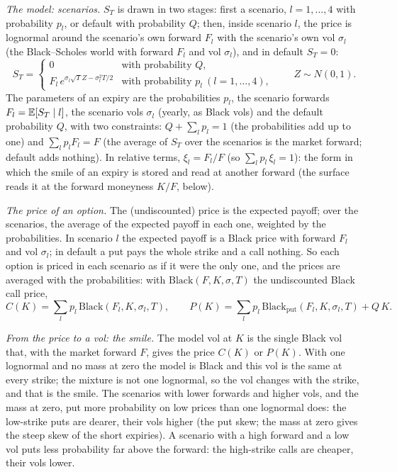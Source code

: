 \emph{The model: scenarios.} $S_T$ is drawn in two stages: first a scenario, $l = 1, \dots, 4$ with probability
$p_l$, or default with probability $Q$; then, inside scenario $l$, the price is lognormal around the scenario's own
forward $F_l$ with the scenario's own vol $\sigma_l$ (the Black--Scholes world with forward $F_l$ and vol
$\sigma_l$), and in default $S_T = 0$:
\[
  S_T = \begin{cases}
    0 & \text{with probability } Q,\\
    F_l\,e^{\sigma_l\sqrt T Z - \sigma_l^2 T/2} & \text{with probability } p_l\ (l = 1,\dots,4),
  \end{cases}
  \qquad Z \sim N(0,1).
\]
The parameters of an expiry are the probabilities $p_l$, the scenario forwards $F_l = \mathbb{E}[S_T \mid l]$, the scenario
vols $\sigma_l$ (yearly, as Black vols) and the default probability $Q$, with two constraints: $Q + \sum_l p_l = 1$
(the probabilities add up to one) and $\sum_l p_l F_l = F$ (the average of $S_T$ over the scenarios is the market
forward; default adds nothing). In relative terms, $\xi_l = F_l/F$ (so $\sum_l p_l\,\xi_l = 1$): the form in which
the smile of an expiry is stored and read at another forward (the surface reads it at the forward moneyness $K/F$,
below).

\emph{The price of an option.} The (undiscounted) price is the expected payoff; over the scenarios, the average of
the expected payoff in each one, weighted by the probabilities. In scenario $l$ the expected payoff is a Black price
with forward $F_l$ and vol $\sigma_l$; in default a put pays the whole strike and a call nothing. So each option is
priced in each scenario as if it were the only one, and the prices are averaged with the probabilities: with
$\mathrm{Black}(F, K, \sigma, T)$ the undiscounted Black call price,
\[
  C(K) = \sum_l p_l\,\mathrm{Black}(F_l, K, \sigma_l, T),\qquad
  P(K) = \sum_l p_l\,\mathrm{Black}_{\mathrm{put}}(F_l, K, \sigma_l, T) + Q\,K.
\]

\emph{From the price to a vol: the smile.} The model vol at $K$ is the single Black vol that, with the market forward
$F$, gives the price $C(K)$ or $P(K)$. With one lognormal and no mass at zero the model is Black and this vol is the
same at every strike; the mixture is not one lognormal, so the vol changes with the strike, and that is the smile.
The scenarios with lower forwards and higher vols, and the mass at zero, put more probability on low prices than one
lognormal does: the low-strike puts are dearer, their vols higher (the put skew; the mass at zero gives the steep
skew of the short expiries). A scenario with a high forward and a low vol puts less probability far above the forward:
the high-strike calls are cheaper, their vols lower.

